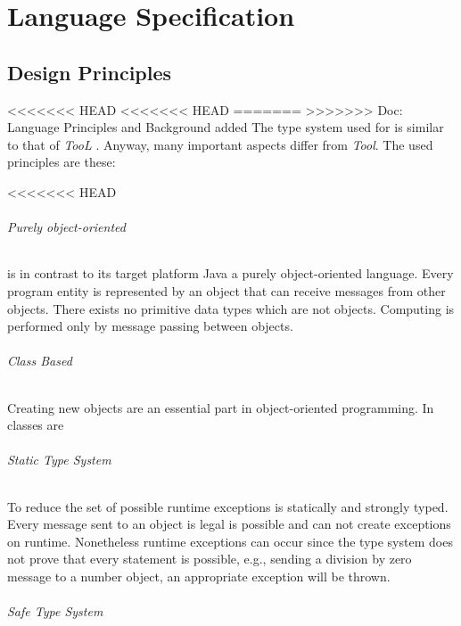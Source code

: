 \part{Language Specification}
\chapter{Design Principles}
<<<<<<< HEAD
<<<<<<< HEAD
=======
>>>>>>> Doc: Language Principles and Background added
The type system used for \ooplss is similar to that of \emph{TooL}
\cite{gawecki_tool:_1995}. Anyway, many important aspects differ from
\emph{Tool}. The used principles are these:

<<<<<<< HEAD
\paragraph{Purely object-oriented}
\ooplss is in contrast to its target platform Java a purely
object-oriented language. Every program entity is represented by an
object that can receive messages from other objects. There exists no
primitive data types which are not objects. Computing is performed only
by message passing between objects.

\paragraph{Class Based}
Creating new objects are an essential part in object-oriented
programming. In \ooplss classes are

\paragraph{Static Type System}
To reduce the set of possible runtime exceptions \ooplss is statically
and strongly typed. Every message sent to an object is legal is possible
and can not create exceptions on runtime. Nonetheless runtime exceptions
can occur since the type system does not prove that every statement is
possible, e.g., sending a division by zero message to a number object,
an appropriate exception will be thrown.

\paragraph{Safe Type System}

